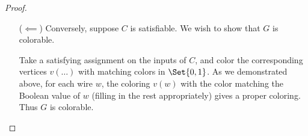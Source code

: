 \begin{aside}
\begin{proof}
\begin{itemize}
\begin{description}
      \item[\OR] Consider an arbitrary \OR{} gate with input \(w_1, w_2\) and
        output \(w'\).  Depending on the colors assigned to \(v(w_1), v(w_2)\),
        the following colorings on the \OR{} gadget are possible:
        \[
          \begin{array}{cc|c|c}
            v(w_1) & v(w_2) & (v_1, v_2) & v(w') \\ \midrule
            0 & 0 & \text{\((1, 2)\) or \((2, 1)\)} & 0 \\
            1 & 1 & \text{\((0, 2)\) or \((2, 0)\)} & 1 \\
            0 & 1 & \text{\((1, 2)\) or \((2, 0)\) } & \text{\(0\) or \(1\)} \\
            1 & 0 & \text{\((0, 2)\) or \((2, 1)\) } & \text{\(1\) or \(0\)}
          \end{array}
        \]
        We see that this doesn't imply that \(v(w')\) is \emph{necessarily}
        assigned the color corresponding to \(w_1 \OR w_2\), but rather that
        there \emph{exists} an assignment to \(v(w')\) equal to \(w_1 \OR
        w_2\).

        It turns out that this distinction is the Achilles' heel of this
        argument.  I'll explain why in detail at the end of the proof and
        continue for now in the interest of finishing up the proof sketch.
      \end{description}
      Finally, since the output wire's vertex neighbors both \(t_0\) and
      \(t_2\), it cannot be colored with either \(0\) or \(2\) and therefore
      must be colored \(1\).  Thus the circuit is also satisfied.

    \item[(\(⟸\))] \label{pf:3col.cg} Conversely, suppose \(C\) is satisfiable.
      We wish to show that \(G\) is colorable.

      Take a satisfying assignment on the inputs of \(C\), and color the
      corresponding vertices \(v(\dots)\) with matching colors in
      \(\Set{0,1}\).  As we demonstrated above, for each wire \(w\), the
      coloring \(v(w)\) with the color matching the Boolean value of \(w\)
      (filling in the rest appropriately) gives a proper coloring.  Thus \(G\)
      is colorable.  \qedhere

  \end{itemize}


\end{proof}
\end{aside}
